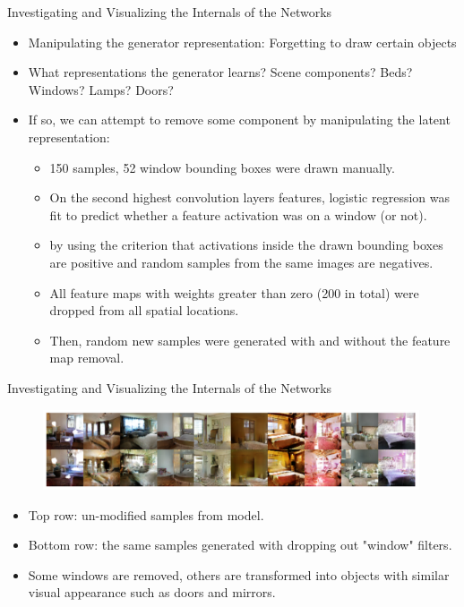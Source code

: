 \documentclass[10pt]{beamer}
\begin{document}
	\begin{frame}{Investigating and Visualizing the Internals of the Networks}
		\begin{itemize}
			\item Manipulating the generator representation: Forgetting to draw certain objects
			\item What representations the generator learns? Scene components? Beds? Windows? Lamps? Doors?
			\item If so, we can attempt to remove some component by manipulating the latent representation:
			\begin{itemize}
				\item 150 samples, 52 window bounding boxes were drawn manually.
				\item On the second highest convolution layers features, logistic regression was fit to predict whether a feature activation was on a window (or not).
				\item by using the criterion that activations inside the drawn bounding boxes are positive and random samples from the same images are negatives.
				\item All feature maps with weights greater than zero (200 in total) were dropped from all spatial locations.
				\item Then, random new samples were generated with and without the feature map removal.
			\end{itemize}
		\end{itemize}
	\end{frame}

	\begin{frame}{Investigating and Visualizing the Internals of the Networks}
		\begin{figure}
			\includegraphics[width=30em]{figures/DCGAN-visualizing-internals-remove-filter.png}
		\end{figure}
		\begin{itemize}
			\item Top row: un-modified samples from model.
			\item Bottom row: the same samples generated with dropping out "window" filters.
			\item Some windows are removed, others are transformed into objects with similar visual appearance such as doors and mirrors.
		\end{itemize}
	\end{frame}
	
\end{document}
